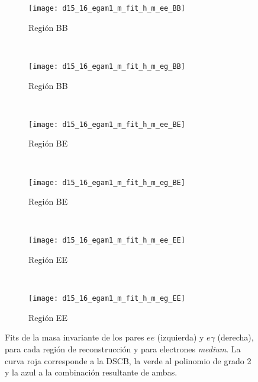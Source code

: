 \begin{figure}

	\begin{subfigure}{0.5\textwidth}
		\texttt{[image: d15\_16\_egam1\_m\_fit\_h\_m\_ee\_BB]} 
		\caption{Región BB}
	\end{subfigure}
	~
	\begin{subfigure}{0.5\textwidth}
		\texttt{[image: d15\_16\_egam1\_m\_fit\_h\_m\_eg\_BB]}
		\caption{Región BB}
	\end{subfigure}
	~
	\begin{subfigure}{0.5\textwidth}
		\texttt{[image: d15\_16\_egam1\_m\_fit\_h\_m\_ee\_BE]} 
		\caption{Región BE}
	\end{subfigure}
	~
	\begin{subfigure}{0.5\textwidth}
		\texttt{[image: d15\_16\_egam1\_m\_fit\_h\_m\_eg\_BE]}
		\caption{Región BE}
	\end{subfigure}
	~
	\begin{subfigure}{0.5\textwidth}
		\texttt{[image: d15\_16\_egam1\_m\_fit\_h\_m\_ee\_EE]} 
		\caption{Región EE}
	\end{subfigure}
	~
	\begin{subfigure}{0.5\textwidth}
		\texttt{[image: d15\_16\_egam1\_m\_fit\_h\_m\_eg\_EE]}
		\caption{Región EE}
	\end{subfigure}

	\caption{Fits de la masa invariante de los pares $ee$ (izquierda) y $e\gamma$ (derecha), para cada región de reconstrucción y para electrones \textit{medium}. La curva roja corresponde a la DSCB, la verde al polinomio de grado 2 y la azul a la combinación resultante de ambas.}
\label{fits_invmass_medium}
\end{figure}

